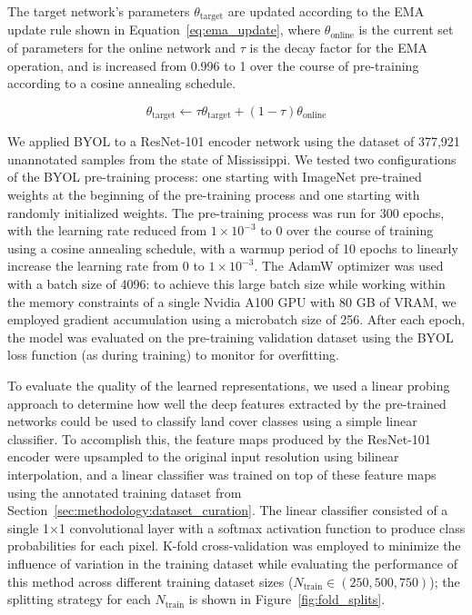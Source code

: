 The target network's parameters \(\theta_\text{target}\) are updated according to the EMA update rule shown in Equation~\ref{eq:ema_update}, where \(\theta_\text{online}\) is the current set of parameters for the online network and \(\tau\) is the decay factor for the EMA operation, and is increased from 0.996 to 1 over the course of pre-training according to a cosine annealing schedule.

\begin{equation}\label{eq:ema_update}
    \theta_\text{target} \leftarrow \tau \theta_\text{target} + (1 - \tau) \theta_\text{online}
\end{equation}

We applied BYOL to a ResNet-101 encoder network using the dataset of 377,921 unannotated samples from the state of Mississippi.
We tested two configurations of the BYOL pre-training process: one starting with ImageNet pre-trained weights at the beginning of the pre-training process and one starting with randomly initialized weights.
The pre-training process was run for 300 epochs, with the learning rate reduced from \(1 \times 10^{-3}\) to 0 over the course of training using a cosine annealing schedule, with a warmup period of 10 epochs to linearly increase the learning rate from 0 to \(1 \times 10^{-3}\).
The AdamW optimizer was used with a batch size of 4096: to achieve this large batch size while working within the memory constraints of a single Nvidia A100 GPU with 80 GB of VRAM, we employed gradient accumulation using a microbatch size of 256.
After each epoch, the model was evaluated on the pre-training validation dataset using the BYOL loss function (as during training) to monitor for overfitting.


To evaluate the quality of the learned representations, we used a linear probing approach to determine how well the deep features extracted by the pre-trained networks could be used to classify land cover classes using a simple linear classifier.
To accomplish this, the feature maps produced by the ResNet-101 encoder were upsampled to the original input resolution using bilinear interpolation, and a linear classifier was trained on top of these feature maps using the annotated training dataset from Section~\ref{sec:methodology:dataset_curation}.
The linear classifier consisted of a single 1\(\times\)1 convolutional layer with a softmax activation function to produce class probabilities for each pixel.
K-fold cross-validation was employed to minimize the influence of variation in the training dataset while evaluating the performance of this method across different training dataset sizes (\(N_\text{train} \in (250, 500, 750)\)); the splitting strategy for each \(N_\text{train}\) is shown in Figure~\ref{fig:fold_splits}.

